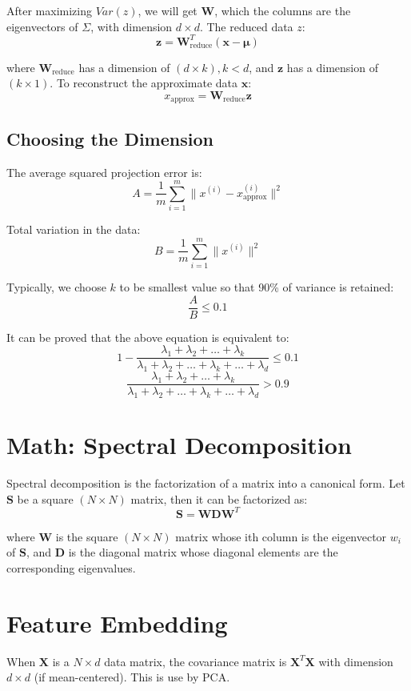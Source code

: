 \begin{multicols*}{2}
\noindent After maximizing $Var(z)$, we will get $\mathbf{W}$, which the columns are the eigenvectors of $\Sigma$, with dimension $d\times d$. The reduced data $z$:
$$\mathbf{z} = \mathbf{W}_{\text{reduce}}^{T} (\mathbf{x} - \mathbf{\mu})$$

\noindent where $\mathbf{W}_{\text{reduce}}$ has a dimension of $(d\times k), k<d$, and $\mathbf{z}$ has a dimension of $(k\times 1)$. To reconstruct the approximate data $\mathbf{x}$:
$$x_{\text{approx}} = \mathbf{W}_{\text{reduce}} \mathbf{z}$$

\subsection{Choosing the Dimension}

\noindent The average squared projection error is:
$$A = \frac{1}{m} \sum_{i=1}^m \| x^{(i)} - x^{(i)}_{\text{approx}}\|^2$$

\noindent Total variation in the data:
$$B = \frac{1}{m} \sum_{i=1}^m \| x^{(i)}\|^2$$

\noindent Typically, we choose $k$ to be smallest value so that 90\% of variance is retained:
$$\frac{A}{B} \le 0.1$$

\noindent It can be proved that the above equation is equivalent to:
$$1 - \frac{\lambda_1+\lambda_2+\ldots+\lambda_k}{\lambda_1+\lambda_2+\ldots+\lambda_k+\ldots+\lambda_d} \le 0.1$$
$$\frac{\lambda_1+\lambda_2+\ldots+\lambda_k}{\lambda_1+\lambda_2+\ldots+\lambda_k+\ldots+\lambda_d} > 0.9$$

\section{Math: Spectral Decomposition}
\noindent Spectral decomposition is the factorization of a matrix into a canonical form. Let $\mathbf{S}$ be a square $(N\times N)$ matrix, then it can be factorized as:
$$\mathbf{S}=\mathbf{WDW}^{T}$$

\noindent where $\mathbf{W}$ is the square $(N\times N)$ matrix whose ith column is the eigenvector $w_i$ of $\mathbf{S}$, and $\mathbf{D}$ is the diagonal matrix whose diagonal elements are the corresponding eigenvalues.

\section{Feature Embedding}
\noindent When $\mathbf{X}$ is a $N\times d$ data matrix, the covariance matrix is $\mathbf{X}^{T} \mathbf{X}$ with dimension $d\times d$ (if mean-centered). This is use by PCA. \\


\end{multicols*}
